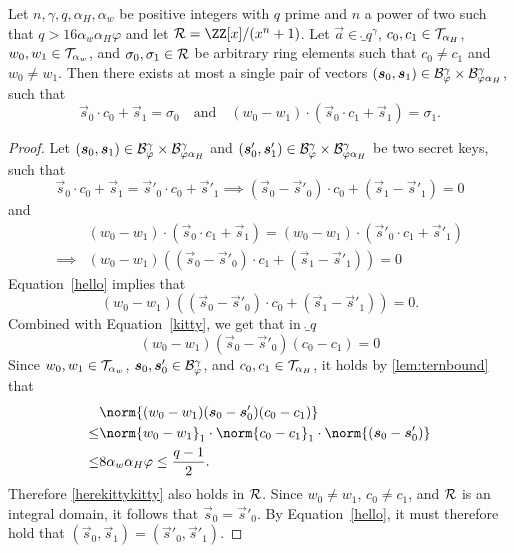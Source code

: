 \begin{lemma}\label{lem:nilssupportivechildsupport}
Let $n,\gamma,q,\alpha_H, \alpha_w$ be positive integers with $q$ prime and $n$ a power of two such that $q > 16 \alpha_w \alpha_H\varphi$ and let $\ring=\ZZ[x]/(x^n+1)$. Let $\vec{a}\in\ring_q^\gamma$, $c_0,c_1 \in \mathcal{T}_{\alpha_{H}}$, $w_0, w_1 \in \mathcal{T}_{\alpha_w}$, and $\sigma_0,\sigma_1 \in \mathcal{R}$ be arbitrary ring elements such that $c_0\neq c_1$ and $w_0 \neq w_1$. Then there exists at most a single pair of vectors $(\boldsymbol{s}_0,\boldsymbol{s}_1)\in\mathcal{B}^\gamma_{\varphi}\times \mathcal{B}^\gamma_{\varphi\alpha_H}$, such that
    \[\vec{s}_0\cdot c_0 + \vec{s}_1 = \sigma_0 \quad\text{and}\quad (w_0 - w_1) \cdot (\vec{s}_0\cdot c_1 + \vec{s}_1) = \sigma_1.\]
\end{lemma}
 \begin{proof}
    Let $(\boldsymbol{s}_0, \boldsymbol{s}_1)\in\mathcal{B}^\gamma_{\varphi}\times \mathcal{B}^\gamma_{\varphi\alpha_H}$ and $(\boldsymbol{s}'_0, \boldsymbol{s}'_1)\in\mathcal{B}^\gamma_{\varphi}\times \mathcal{B}^\gamma_{\varphi\alpha_H}$ be two secret keys, such that 
    \begin{equation}
    \vec{s}_0\cdot c_0 + \vec{s}_1 = \vec{s}'_0\cdot c_0 + \vec{s}'_1 \implies (\vec{s}_0 - \vec{s}'_0)\cdot c_0 + (\vec{s}_1 - \vec{s}'_1) = 0 \label{hello}
    \end{equation}
    and 
    \begin{equation}
    \begin{aligned}
    &(w_0 - w_1) \cdot (\vec{s}_0\cdot c_1 + \vec{s}_1) = (w_0 - w_1) \cdot (\vec{s}'_0\cdot c_1 + \vec{s}'_1)\\ \implies& (w_0 - w_1)((\vec{s}_0 - \vec{s}'_0)\cdot c_1 + (\vec{s}_1 - \vec{s}'_1)) = 0 \label{kitty}
    \end{aligned}
    \end{equation}
    Equation~\ref{hello} implies that 
    \[
    (w_0 - w_1)((\vec{s}_0 - \vec{s}'_0)\cdot c_0 + (\vec{s}_1 - \vec{s}'_1)) = 0.
    \]
    Combined with Equation~\ref{kitty}, we get that in $\ring_q$
    \begin{equation}
    (w_0 - w_1)(\vec{s}_0 - \vec{s}'_0) (c_0 - c_1)  = 0 \label{herekittykitty}
    \end{equation}
    Since $w_0,w_1\in\mathcal{T}_{\alpha_w}$, $\boldsymbol{s}_0,\boldsymbol{s}'_0 \in \mathcal{B}^\gamma_{\varphi}$, and $c_0,c_1\in\mathcal{T}_{\alpha_{H}}$, it holds by \autoref{lem:ternbound} that
    \[
      \begin{aligned}
      &\norm{(w_0 - w_1)(\vec{s}_0 - \vec{s}'_0) (c_0 - c_1)}\\
       \leq& \norm{w_0 - w_1}_1\cdot\norm{c_0 - c_1}_1\cdot \norm{(\vec{s}_0 - \vec{s}'_0)}\\ \leq& 8\alpha_w\alpha_H\varphi \leq \frac{q-1}{2}.
      \end{aligned}
    \]
    Therefore \autoref{herekittykitty} also holds in $\mathcal{R}$.
    Since $w_0 \neq w_1$, $c_0 \neq c_1$, and $\mathcal{R}$ is an integral domain, it follows that $\vec{s}_0 = \vec{s}'_0$.
    By Equation~\ref{hello}, it must therefore hold that $(\vec{s}_0, \vec{s}_1) = (\vec{s}'_0, \vec{s}'_1)$.
    
\end{proof}
